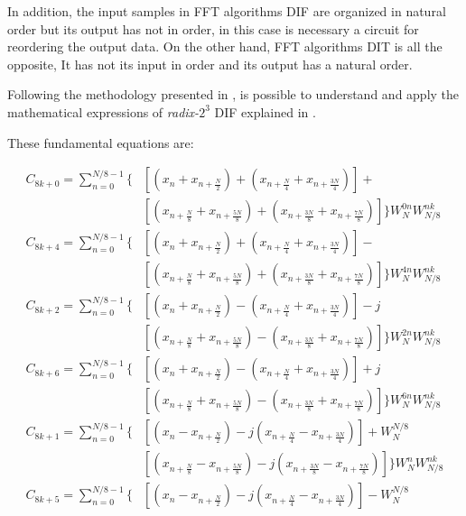 \documentclass[journal,comsoc]{IEEEtran}
\begin{document}
In addition, the input samples in FFT algorithms DIF are organized in natural order but its output has not in order, in this case is necessary a circuit for reordering the output data. On the other hand, FFT algorithms DIT is all the  opposite, It has not its input in order and its output has a natural order.

Following the methodology presented in \cite{proakis_digital_nodate}, is possible to understand and apply the mathematical expressions of \textit{radix-}$2^3$ DIF explained in \cite{jia_efficient_nodate}. 

These fundamental equations are:

\begingroup
\allowdisplaybreaks
\begin{small}
\begin{align}\label{eqn:radix}
C_{8k+0} = \sum_{n=0}^{N/8-1} \bigg\{&[(x_n + x_{n+\frac{N}{2}}) + (x_{n+\frac{N}{4}} + x_{n+\frac{3N}{4}})] + 	   				    \\
&[(x_{n+\frac{N}{8}} + x_{n+\frac{5N}{8}}) + (x_{n+\frac{3N}{8}} + x_{n+\frac{7N}{8}})] \bigg\} W_N^{0n} W_{N/8}^ {nk}     \nonumber\\
%	
C_{8k+4} = \sum_{n=0}^{N/8-1} \bigg\{&[(x_n + x_{n+\frac{N}{2}}) + (x_{n+\frac{N}{4}} + x_{n+\frac{3N}{4}})] - 			   \nonumber\\
&[(x_{n+\frac{N}{8}} + x_{n+\frac{5N}{8}}) + (x_{n+\frac{3N}{8}} + x_{n+\frac{7N}{8}})] \bigg\} W_N^{4n} W_{N/8}^ {nk}     \nonumber\\
%
C_{8k+2} = \sum_{n=0}^{N/8-1} \bigg\{&[(x_n + x_{n+\frac{N}{2}}) - (x_{n+\frac{N}{4}} + x_{n+\frac{3N}{4}})] -j 		   \nonumber\\
&[(x_{n+\frac{N}{8}} + x_{n+\frac{5N}{8}}) - (x_{n+\frac{3N}{8}} + x_{n+\frac{7N}{8}})] \bigg\} W_N^{2n} W_{N/8}^ {nk}     \nonumber\\
%
C_{8k+6} = \sum_{n=0}^{N/8-1} \bigg\{&[(x_n + x_{n+\frac{N}{2}}) - (x_{n+\frac{N}{4}} + x_{n+\frac{3N}{4}})] +j			   \nonumber\\
&[(x_{n+\frac{N}{8}} + x_{n+\frac{5N}{8}}) - (x_{n+\frac{3N}{8}} + x_{n+\frac{7N}{8}})] \bigg\} W_N^{6n} W_{N/8}^ {nk}     \nonumber\\
%
C_{8k+1} = \sum_{n=0}^{N/8-1} \bigg\{&[(x_n - x_{n+\frac{N}{2}}) -j (x_{n+\frac{N}{4}} - x_{n+\frac{3N}{4}})] + W_N^{N/8}  \nonumber\\
&[(x_{n+\frac{N}{8}} - x_{n+\frac{5N}{8}}) -j (x_{n+\frac{3N}{8}} - x_{n+\frac{7N}{8}})] \bigg\} W_N^{n} W_{N/8}^ {nk}     \nonumber\\
%
C_{8k+5} = \sum_{n=0}^{N/8-1} \bigg\{&[(x_n - x_{n+\frac{N}{2}}) -j (x_{n+\frac{N}{4}} - x_{n+\frac{3N}{4}})] - W_N^{N/8}  \nonumber\\

\end{align}
\end{small}
\end{document}
